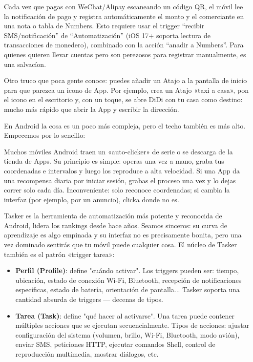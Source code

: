 
Cada vez que pagas con WeChat/Alipay escaneando un código QR, el móvil lee la notificación de pago y registra automáticamente el monto y el comerciante en una nota o tabla de Numbers. Esto requiere usar el trigger “recibir SMS/notificación” de “Automatización” (iOS 17+ soporta lectura de transacciones de monedero), combinado con la acción “anadir a Numbers”. Para quienes quieren llevar cuentas pero son perezosos para registrar manualmente, es una salvacíon.

Otro truco que poca gente conoce: puedes añadir un Atajo a la pantalla de inicio para que parezca un icono de App. Por ejemplo, crea un Atajo «taxi a casa», pon el icono en el escritorio y, con un toque, se abre DiDi con tu casa como destino: mucho más rápido que abrir la App y escribir la dirección.


En Android la cosa es un poco más compleja, pero el techo también es más alto. Empecemos por lo sencillo:


Muchos móviles Android traen un «auto-clicker» de serie o se descarga de la tienda de Apps. Su principio es simple: operas una vez a mano, graba tus coordenadas e intervalos y luego los reproduce a alta velocidad. Si una App da una recompensa diaria por iniciar sesión, grabas el proceso una vez y lo dejas correr solo cada día. Inconveniente: solo reconoce coordenadas; si cambia la interfaz (por ejemplo, por un anuncio), clicka donde no es.


Tasker es la herramienta de automatización más potente y reconocida de Android, lidera los rankings desde hace años. Seamos sinceros: su curva de aprendizaje es algo empinada y su interfaz no es precisamente bonita, pero una vez dominado sentirás que tu móvil puede cualquier cosa. El núcleo de Tasker también es el patrón «trigger tarea»:

\begin{itemize}
  \item \textbf{Perfil (Profile)}: define "cuándo activar". Los triggers pueden ser: tiempo, ubicación, estado de conexión Wi-Fi, Bluetooth, recepción de notificaciones específicas, estado de batería, orientación de pantalla... Tasker soporta una cantidad absurda de triggers — decenas de tipos.
  \item \textbf{Tarea (Task)}: define "qué hacer al activarse". Una tarea puede contener múltiples acciones que se ejecutan secuencialmente. Tipos de acciones: ajustar configuración del sistema (volumen, brillo, Wi-Fi, Bluetooth, modo avión), enviar SMS, peticiones HTTP, ejecutar comandos Shell, control de reproducción multimedia, mostrar diálogos, etc.
\end{itemize}

